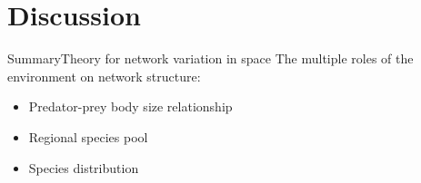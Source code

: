 \documentclass{eecslides}
\begin{document}



	\section{Discussion}


	\begin{frame}{Summary}{Theory for network variation in space}
		The multiple roles of the environment on network structure: 
		\begin{itemize}
			\item Predator-prey body size relationship
			\item Regional species pool 
			\item Species distribution
		\end{itemize}
	\end{frame}

\end{document}
